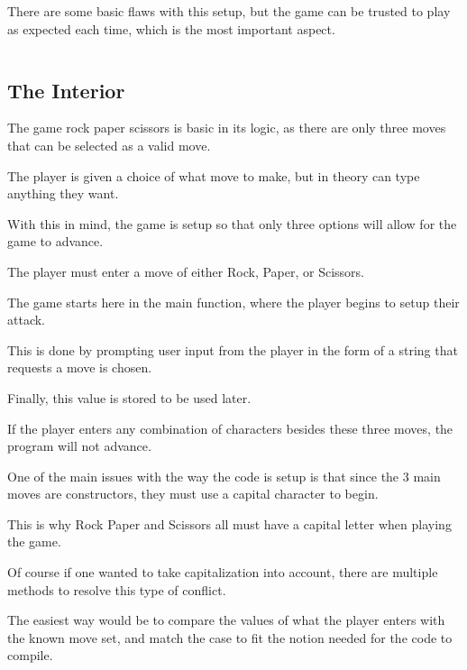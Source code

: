 \documentclass{article}
\begin{document}
\medskip\noindent
There are some basic flaws with this setup, but the game can be trusted to play as expected each time, which is the most important aspect.

\medskip\medskip
\begin{lstlisting}
\end{lstlisting}

\medskip

\subsection{The Interior}
\medskip\medskip
\hspace{\parindent} 

\medskip\noindent
The game rock paper scissors is basic in its logic, as there are only three moves that can be selected as a valid move.

\medskip\noindent
The player is given a choice of what move to make, but in theory can type anything they want. 

\medskip\noindent
With this in mind, the game is setup so that only three options will allow for the game to advance.

\medskip\noindent
The player must enter a move of either Rock, Paper, or Scissors.

\medskip\noindent
The game starts here in the main function, where the player begins to setup their attack.

\medskip\noindent
This is done by prompting user input from the player in the form of a string that requests a move is chosen. 

\medskip\noindent
Finally, this value is stored to be used later.

\medskip\noindent
If the player enters any combination of characters besides these three moves, the program will not advance. 

\medskip\noindent
One of the main issues with the way the code is setup is that since the 3 main moves are constructors, they must use a capital character to begin. 

\medskip\noindent
This is why Rock Paper and Scissors all must have a capital letter when playing the game.

\medskip\noindent
Of course if one wanted to take capitalization into account, there are multiple methods to resolve this type of conflict. 

\medskip\noindent
The easiest way would be to compare the values of what the player enters with the known move set, and match the case to fit the notion needed for the code to compile. 
\end{document}
